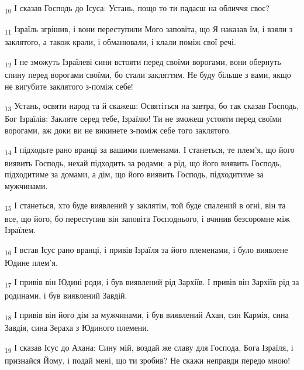 \begin{tcolorbox}
\textsubscript{10} І сказав Господь до Ісуса: Устань, пощо то ти падаєш на обличчя своє?
\end{tcolorbox}
\begin{tcolorbox}
\textsubscript{11} Ізраїль згрішив, і вони переступили Мого заповіта, що Я наказав їм, і взяли з заклятого, а також крали, і обманювали, і клали поміж свої речі.
\end{tcolorbox}
\begin{tcolorbox}
\textsubscript{12} І не зможуть Ізраїлеві сини встояти перед своїми ворогами, вони обернуть спину перед ворогами своїми, бо стали закляттям. Не буду більше з вами, якщо не вигубите заклятого з-поміж себе!
\end{tcolorbox}
\begin{tcolorbox}
\textsubscript{13} Устань, освяти народ та й скажеш: Освятіться на завтра, бо так сказав Господь, Бог Ізраїлів: Закляте серед тебе, Ізраїлю! Ти не зможеш устояти перед своїми ворогами, аж доки ви не викинете з-поміж себе того заклятого.
\end{tcolorbox}
\begin{tcolorbox}
\textsubscript{14} І підходьте рано вранці за вашими племенами. І станеться, те плем'я, що його виявить Господь, нехай підходить за родами; а рід, що його виявить Господь, підходитиме за домами, а дім, що його виявить Господь, підходитиме за мужчинами.
\end{tcolorbox}
\begin{tcolorbox}
\textsubscript{15} І станеться, хто буде виявлений у заклятім, той буде спалений в огні, він та все, що його, бо переступив він заповіта Господнього, і вчинив безсоромне між Ізраїлем.
\end{tcolorbox}
\begin{tcolorbox}
\textsubscript{16} І встав Ісус рано вранці, і привів Ізраїля за його племенами, і було виявлене Юдине плем'я.
\end{tcolorbox}
\begin{tcolorbox}
\textsubscript{17} І привів він Юдині роди, і був виявлений рід Зархіїв. І привів він Зархіїв рід за родинами, і був виявлений Завдій.
\end{tcolorbox}
\begin{tcolorbox}
\textsubscript{18} І привів він його дім за мужчинами, і був виявлений Ахан, син Кармія, сина Завдія, сина Зераха з Юдиного племени.
\end{tcolorbox}
\begin{tcolorbox}
\textsubscript{19} І сказав Ісус до Ахана: Сину мій, воздай же славу для Господа, Бога Ізраїля, і признайся Йому, і подай мені, що ти зробив? Не скажи неправди передо мною!
\end{tcolorbox}
